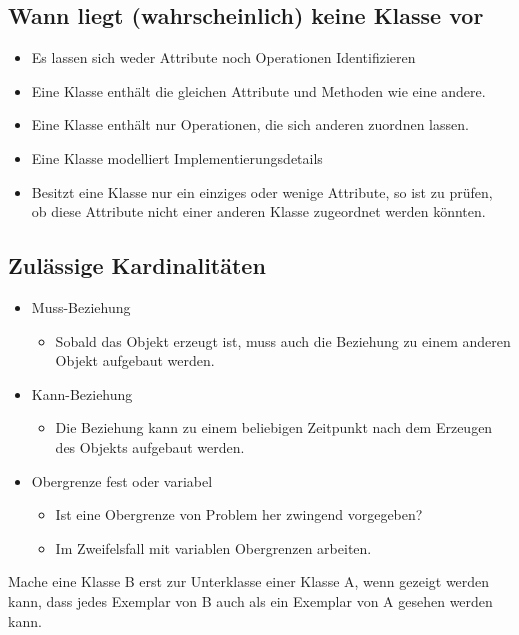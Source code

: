 \subsection{Wann liegt (wahrscheinlich) keine Klasse vor}
\begin{itemize}
    \item Es lassen sich weder Attribute noch Operationen Identifizieren
    \item Eine Klasse enthält die gleichen Attribute und Methoden wie eine andere.
    \item Eine Klasse enthält nur Operationen, die sich anderen zuordnen lassen.
    \item Eine Klasse modelliert Implementierungsdetails
    \item Besitzt eine Klasse nur ein einziges oder wenige Attribute, so ist zu prüfen, ob diese Attribute nicht einer anderen Klasse zugeordnet werden könnten.
\end{itemize}

\subsection{Zulässige Kardinalitäten}
\begin{itemize}
    \item Muss-Beziehung
    \begin{itemize}
        \item Sobald das Objekt erzeugt ist, muss auch die Beziehung zu einem anderen Objekt aufgebaut werden.
    \end{itemize}
    \item Kann-Beziehung
    \begin{itemize}
        \item Die Beziehung kann zu einem beliebigen Zeitpunkt nach dem Erzeugen des Objekts aufgebaut werden.
    \end{itemize}
    \item Obergrenze fest oder variabel
    \begin{itemize}
        \item Ist eine Obergrenze von Problem her zwingend vorgegeben?
        \item Im Zweifelsfall mit variablen Obergrenzen arbeiten.
    \end{itemize}
\end{itemize}

Mache eine Klasse B erst zur Unterklasse einer Klasse A, wenn gezeigt werden kann, dass jedes Exemplar von B auch als ein Exemplar von A gesehen werden kann.
